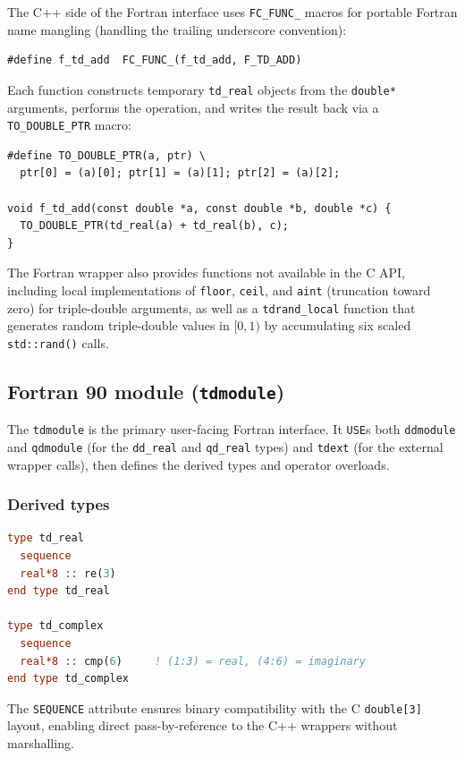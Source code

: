 \documentclass[11pt,a4paper]{article}
\begin{document}
The C++ side of the Fortran interface uses \texttt{FC\_FUNC\_}
macros for portable Fortran name mangling (handling the trailing
underscore convention):
\begin{lstlisting}
#define f_td_add  FC_FUNC_(f_td_add, F_TD_ADD)
\end{lstlisting}
Each function constructs temporary \texttt{td\_real} objects from
the \texttt{double*} arguments, performs the operation, and writes
the result back via a \texttt{TO\_DOUBLE\_PTR} macro:
\begin{lstlisting}
#define TO_DOUBLE_PTR(a, ptr) \
  ptr[0] = (a)[0]; ptr[1] = (a)[1]; ptr[2] = (a)[2];

void f_td_add(const double *a, const double *b, double *c) {
  TO_DOUBLE_PTR(td_real(a) + td_real(b), c);
}
\end{lstlisting}

The Fortran wrapper also provides functions not available in the C
API, including local implementations of \texttt{floor},
\texttt{ceil}, and \texttt{aint} (truncation toward zero) for
triple-double arguments, as well as a \texttt{tdrand\_local}
function that generates random triple-double values in $[0, 1)$
by accumulating six scaled \texttt{std::rand()} calls.

\subsection{Fortran 90 module (\texttt{tdmodule})}

The \texttt{tdmodule} is the primary user-facing Fortran interface.
It \texttt{USE}s both \texttt{ddmodule} and \texttt{qdmodule}
(for the \texttt{dd\_real} and \texttt{qd\_real} types) and
\texttt{tdext} (for the external wrapper calls), then defines the
derived types and operator overloads.

\subsubsection{Derived types}

\begin{lstlisting}[language=Fortran]
type td_real
  sequence
  real*8 :: re(3)
end type td_real

type td_complex
  sequence
  real*8 :: cmp(6)     ! (1:3) = real, (4:6) = imaginary
end type td_complex
\end{lstlisting}
The \texttt{SEQUENCE} attribute ensures binary compatibility with
the C \texttt{double[3]} layout, enabling direct pass-by-reference
to the C++ wrappers without marshalling.
\end{document}
